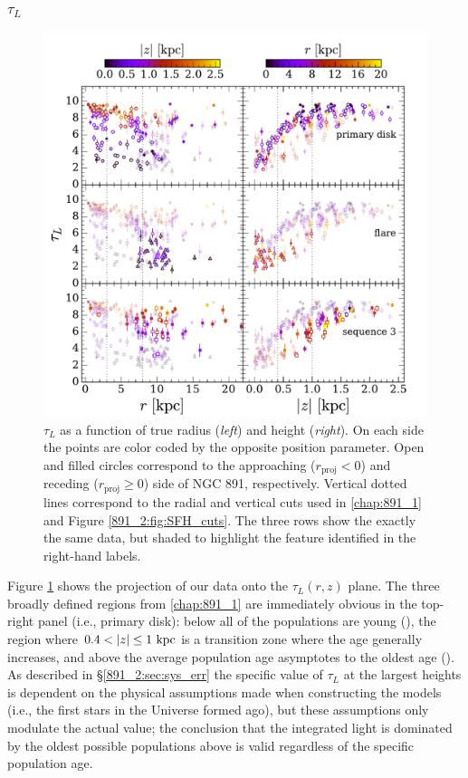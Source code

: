 \subsubsection{$\tau_L$}
\begin{figure}
  \centering
  \includegraphics[width=\textwidth]{891_2/figs/MLWA_rz_all.pdf}
  \caption[$\tau_L$ vs
    ($r,|z|$)]{\fixspacing\label{891_2:fig:MLWA_rz}$\tau_L$ as a
    function of true radius (\emph{left}) and height
    (\emph{right}). On each side the points are color coded by the
    opposite position parameter. Open and filled circles correspond to
    the approaching ($r_\mathrm{proj} < 0$) and receding
    ($r_\mathrm{proj}\geq 0$) side of NGC 891, respectively. Vertical
    dotted lines correspond to the radial and vertical cuts used in
    \ref{chap:891_1} and Figure \ref{891_2:fig:SFH_cuts}. The three
    rows show the exactly the same data, but shaded to highlight the
    feature identified in the right-hand labels.}
\end{figure}

Figure \ref{891_2:fig:MLWA_rz} shows the projection of our data onto the
$\tau_L(r,z)$ plane. The three broadly defined regions from
\ref{chap:891_1} are immediately obvious in the top-right
panel (i.e., primary disk): below  all of the
populations are young (), the region where $0.4 < |z|
\leq 1~\mathrm{kpc} $ is a transition zone where the age generally
increases, and above  the average population age
asymptotes to the oldest age (). As described in
\S\ref{891_2:sec:sys_err} the specific value of $\tau_L$ at the largest
heights is dependent on the physical assumptions made when
constructing the models (i.e., the first stars in the Universe formed
 ago), but these assumptions only modulate the
actual value; the conclusion that the integrated light is dominated by
the oldest possible populations above  is valid regardless
of the specific population age.

